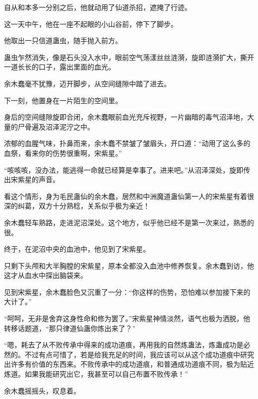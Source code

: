\begin{this_body}
自从和本多一分别之后，他就动用了仙道杀招，遮掩了行迹。

这一天中午，他在一座不起眼的小山谷前，停下了脚步。

他取出一只信道蛊虫，随手抛入前方。

蛊虫乍然消失，像是石头没入水中，眼前空气荡漾丝丝涟漪，旋即涟漪扩大，撕开一道长长的口子，露出里面的血光。

余木蠢毫不犹豫，迈开脚步，从空间缝隙中踏了进去。

下一刻，他置身在一片陌生的空间里。

身后的空间缝隙旋即合闭，余木蠢眼前血光充斥视野，一片幽暗的毒气沼泽地，大量的尸骨遍及沼泽泥泞之中。

浓郁的血腥气味，扑鼻而来，余木蠢不禁皱了皱眉头，开口道：“动用了这么多的血祭，看来你的伤势很重啊，宋紫星。”

“咳咳咳，没办法，能逃得一命就已经算是幸事了。进来吧。”从沼泽深处，旋即传出宋紫星的声音。

看这个情形，身为毛民蛊仙的余木蠢，居然和中洲魔道蛊仙第一人的宋紫星有着很深的纠葛，双方十分熟稔，关系似乎极为亲近！

余木蠢轻车熟路，走进泥沼深处。这个地方，似乎他已经不是第一次来过，熟悉的很。

终于，在泥沼中央的血池中，他见到了宋紫星。

只剩下头颅和大半胸膛的宋紫星，原本全都没入血池中修养恢复。余木蠢到访，他这才从血水中探出脑袋来。

见到宋紫星，余木蠢脸色又沉重了一分：“你这样的伤势，恐怕难以参加接下来的大计了。”

“呵呵，无非是舍弃这身性命和修为罢了。”宋紫星神情淡然，语气也极为洒脱，他转移话题道，“那只律道仙蛊你炼出来了？”

“嗯，耗去了从不败传承中得来的成功道痕，再用我的自然炼蛊法，炼蛊成功是必然的。不过有点可惜了，若是给我充足的时间，我应该可以从这个成功道痕中研究出许多有价值的东西来。不败传承中的成功道痕，和普通成功道痕不同，极为贴近炼道。如果我能研究出它，我甚至可以自己布置不败传承！”

余木蠢摇摇头，叹息着。

\end{this_body}

